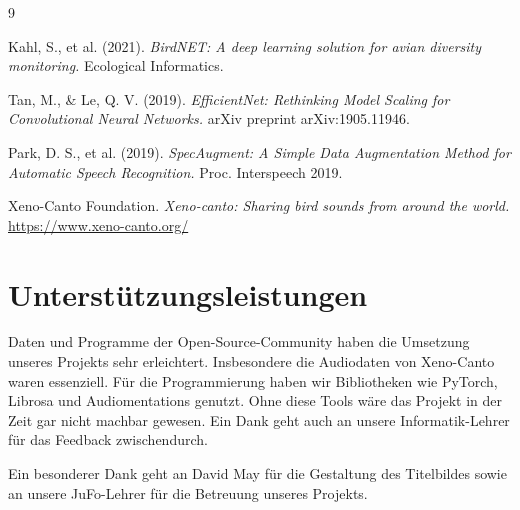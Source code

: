 \documentclass[10pt, a4paper]{scrartcl}
\begin{document}
\newpage
\renewcommand\refname{Quellen- und Literaturverzeichnis}
\begin{thebibliography}{9}

Kahl, S., et al. (2021).
\textit{BirdNET: A deep learning solution for avian diversity monitoring.}
Ecological Informatics.

Tan, M., \& Le, Q. V. (2019).
\textit{EfficientNet: Rethinking Model Scaling for Convolutional Neural Networks.}
arXiv preprint arXiv:1905.11946.

Park, D. S., et al. (2019).
\textit{SpecAugment: A Simple Data Augmentation Method for Automatic Speech Recognition.}
Proc. Interspeech 2019.

Xeno-Canto Foundation.
\textit{Xeno-canto: Sharing bird sounds from around the world.}
\url{https://www.xeno-canto.org/}

\end{thebibliography}

\newpage
\section*{Unterstützungsleistungen}
Daten und Programme  der Open-Source-Community haben die Umsetzung unseres Projekts sehr erleichtert. Insbesondere die Audiodaten von Xeno-Canto waren essenziell. Für die Programmierung haben wir Bibliotheken wie PyTorch, Librosa und Audiomentations genutzt. Ohne diese Tools wäre das Projekt in der Zeit gar nicht machbar gewesen. Ein Dank geht auch an unsere Informatik-Lehrer für das Feedback zwischendurch.

Ein besonderer Dank geht an David May für die Gestaltung des Titelbildes sowie an unsere JuFo-Lehrer für die Betreuung unseres Projekts.
\end{document}
